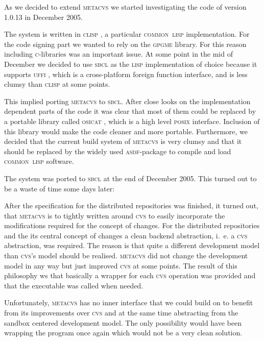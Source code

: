 \documentclass[fleqn, 10pt, a4paper]{report} \usepackage{amssymb}
\begin{document}
As we decided to extend \textsc{metacvs} we started investigating the
code of version 1.0.13 in December 2005.

The system is written in \textsc{clisp} \cite{Clis06}, a particular
\textsc{common~lisp} implementation. For the code signing part we
wanted to rely on the \textsc{gpgme} \cite{Gnup06} library. For this reason
including \textsc{c}-libraries was an important issue. At some point
in the mid of December we decided to use \textsc{sbcl} \cite{Sbcl06} as the
\textsc{lisp} implementation of choice because it supports
\textsc{uffi} \cite{Uffi06},
which is a cross-platform foreign function interface,
and is less clumsy than \textsc{clisp} at some points.

This implied porting \textsc{metacvs} to \textsc{sbcl}. After close
looks on the implementation dependent parts of the code it was clear
that most of them could be replaced by a portable library called
\textsc{osicat} \cite{Osic06}, which is a high level \textsc{posix} interface.
Inclusion of this library would make the code cleaner and more
portable. Furthermore, we decided that the current build system of
\textsc{metacvs} is very clumsy and that it should be replaced by the
widely used \textsc{asdf}-package \cite{Asdf06} to compile and load
\textsc{common~lisp} software.

The system was ported to \textsc{sbcl} at the end of December 2005.
This turned out to be a waste of time some days later:

After the specification for the distributed repositories was finished,
it turned out, that \textsc{metacvs} is to tightly written around
\textsc{cvs} to easily incorporate the modifications required for the
concept of changes. For the distributed repositories and the its
central concept of changes a clean backend abstraction, i.~e. a
\textsc{cvs} abstraction, was required. The reason is that quite a
different development model than \textsc{cvs}'s model should be
realised. \textsc{metacvs} did not change the development model in any
way but just improved \textsc{cvs} at some points.  The result of this
philosophy ws that basically a wrapper for each \textsc{cvs} operation
was provided and that the executable was called when needed.

Unfortunately, \textsc{metacvs} has no inner interface that we could
build on to benefit from its improvements over \textsc{cvs} and at the
same time abstracting from the sandbox centered development model. The
only possibility would have been wrapping the program once again which
would not be a very clean solution.
\end{document}
